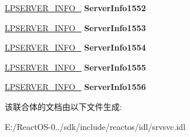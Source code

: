 \begin{DoxyCompactItemize}
\item 
\mbox{\label{union___s_e_r_v_e_r___i_n_f_o_aff856a8e05235333ce6bb70be0cc7f91}} 
\hyperlink{struct___s_e_r_v_e_r___i_n_f_o__1552}{L\+P\+S\+E\+R\+V\+E\+R\+\_\+\+I\+N\+F\+O\+\_} {\bfseries Server\+Info1552}
\item 
\mbox{\label{union___s_e_r_v_e_r___i_n_f_o_a88004bb374079469f8d2ababf68f4902}} 
\hyperlink{struct___s_e_r_v_e_r___i_n_f_o__1553}{L\+P\+S\+E\+R\+V\+E\+R\+\_\+\+I\+N\+F\+O\+\_} {\bfseries Server\+Info1553}
\item 
\mbox{\label{union___s_e_r_v_e_r___i_n_f_o_a2f8446b62b169ce90655563b3d0852e7}} 
\hyperlink{struct___s_e_r_v_e_r___i_n_f_o__1554}{L\+P\+S\+E\+R\+V\+E\+R\+\_\+\+I\+N\+F\+O\+\_} {\bfseries Server\+Info1554}
\item 
\mbox{\label{union___s_e_r_v_e_r___i_n_f_o_aeb7009a10e54ec8bb3c5678aab67bc4e}} 
\hyperlink{struct___s_e_r_v_e_r___i_n_f_o__1555}{L\+P\+S\+E\+R\+V\+E\+R\+\_\+\+I\+N\+F\+O\+\_} {\bfseries Server\+Info1555}
\item 
\mbox{\label{union___s_e_r_v_e_r___i_n_f_o_afd55abb79180e83fbf1da94df740d50d}} 
\hyperlink{struct___s_e_r_v_e_r___i_n_f_o__1556}{L\+P\+S\+E\+R\+V\+E\+R\+\_\+\+I\+N\+F\+O\+\_} {\bfseries Server\+Info1556}
\end{DoxyCompactItemize}


该联合体的文档由以下文件生成\+:\begin{DoxyCompactItemize}
\item 
E\+:/\+React\+O\+S-\/0../sdk/include/reactos/idl/srvsvc.\+idl\end{DoxyCompactItemize}
